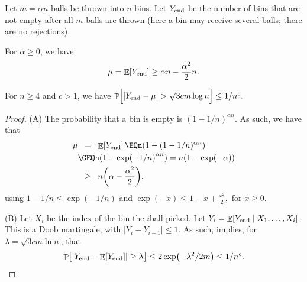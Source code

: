 \begin{lemma}
    Let $m = \alpha n$ balls be thrown into $n$ bins.  Let $Y_{\mathrm{end}}$ be the
    number of bins that are not empty after all $m$ balls are thrown
    (here a bin may receive several balls; there are no rejections).
    \begin{compactenumA}
        \item For $\alpha \geq 0$, we have
        \begin{equation*}
            \mu%
            =%
            \Ex{\Yend}%
            \geq %
            \alpha n - \frac{\alpha^2}{2} n.
        \end{equation*}

        \item For $n \geq 4$ and  $c > 1$, we have
        \begin{math}
            \Bigl.  \Prob{\Bigl.\cardin{\Yend - \mu} > \smash{\sqrt{3
                     c m \log n}}} %
            \leq%
            1/n^c.
        \end{math}
    \end{compactenumA}
\end{lemma}
\begin{proof}
    (A) The probability that a bin is empty is $(1-1/n)^{\alpha n}$. As
    such, we have that
    \begin{align*}
        \mu %
        &\EQ%
        \Ex{\Yend}%
        \EQ%
        n\pth{ 1-(1-1/n)^{\alpha n}}%
        \\&
        \GEQ%
        n\pth{ 1-\exp\pth{-1/n}^{\alpha n}}%
        =%
        n\pth{ 1-\exp\pth{ -\alpha }}
        \\&
        \GEQ %
        n\pth{ \alpha - \frac{\alpha^2}{2}},        
    \end{align*}
    using $1-1/n \leq \exp(-1/n)$ and
    \begin{math}
        \exp(-x)
        \leq
        1 - x + \frac{x^2}{2},
    \end{math}
    for $x \geq 0$.

    
    \medskip%
    (B) Let $X_i$ be the index of the bin the $i$\th ball picked. Let
    $Y_i = \mathop{\mathbb{E}}\!\left[ Y_{\mathrm{end}} \;\middle\vert\; X_1, \ldots, X_i \right]$. This is a Doob
    martingale, with $|Y_i - Y_{i-1}| \leq 1$. As such,
     implies, for
    $\lambda = \sqrt{ 3c m \ln n}$, that
    \begin{equation*}
        \Prob{ \bigl. \cardin{\Yend - \Ex{\Yend}} \geq \lambda}%
        \leq%
        2\exp \pth{-\lambda^2/ 2m}%
        \leq%
        1/n^c.
    \end{equation*}
\end{proof}%


